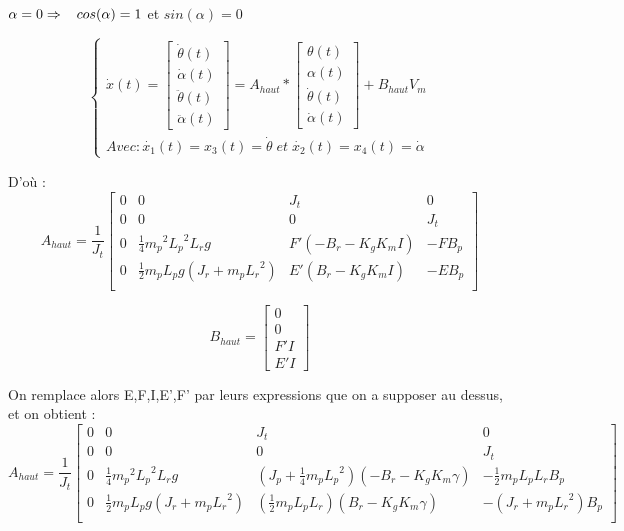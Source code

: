 \documentclass[12pt, a4paper, openany]{report}
\begin{document}
$\alpha = 0 \Rightarrow \hspace{3mm} cos(\alpha) = 1$ et $sin(\alpha) = 0$ 


\begin{equation*}
\left\{\begin{matrix}
\dot{x}(t) = \begin{bmatrix}
\dot{\theta}(t)\\ 
\dot{\alpha}(t)\\ 
\ddot{\theta}(t)\\ 
\ddot{\alpha}(t)
\end{bmatrix} = A_{haut}*\begin{bmatrix}
\theta(t)\\ 
\alpha(t)\\ 
\dot{\theta}(t)\\ 
\dot{\alpha}(t)
\end{bmatrix} + B_{haut} V_m\\ 

Avec : \dot{x_1}(t) = x_3(t) = \dot{\theta}\; et \; \dot{x_2}(t) = x_4(t) = \dot{\alpha}
\end{matrix}\right.
\end{equation*}

D’où : 
\begin{equation*}
    A_{haut} = \frac{1}{J_t} \begin{bmatrix}
0 & 0 & J_t & 0\\
0 & 0 & 0 & J_t\\
0 & \frac{1}{4}{m_p}^2{L_p}^2L_rg & F'(-B_r-K_gK_mI)& -FB_p \\
0 & \frac{1}{2}m_pL_pg(J_r+m_p{L_r}^2) & E'(B_r-K_gK_mI) & -EB_p\\
\end{bmatrix}
\end{equation*}

\begin{equation*}
    B_{haut} = \begin{bmatrix}
    0\\ 
    0\\ 
    F'I\\ 
    E'I
\end{bmatrix}
\end{equation*}

On remplace alors E,F,I,E',F' par leurs expressions que on a supposer au dessus, et on obtient : 
\begin{equation*}
    A_{haut} = \frac{1}{J_t} \begin{bmatrix}
0 & 0 & J_t & 0\\
0 & 0 & 0 & J_t\\
0 & \frac{1}{4}{m_p}^2{L_p}^2L_rg & (J_p+\frac{1}{4}m_p{L_p}^2)(-B_r-K_gK_m\gamma)& -\frac{1}{2}m_pL_pL_rB_p \\
0 & \frac{1}{2}m_pL_pg(J_r+m_p{L_r}^2) & (\frac{1}{2}m_pL_pL_r)(B_r-K_gK_m\gamma) & -(J_r+m_p{L_r}^2)B_p\\
\end{bmatrix}
\end{equation*}
\end{document}

